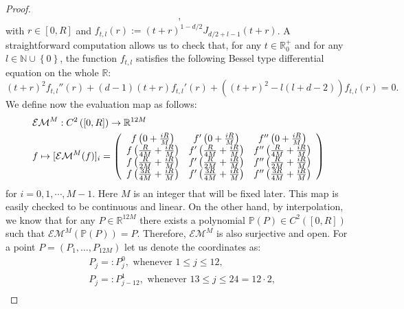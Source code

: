 \documentclass{amsart}
\theoremstyle{definition}
\theoremstyle{remark}
\renewcommand\leq\leqslant
\numberwithin{equation}{section}
\theoremstyle{definition}
\theoremstyle{remark}
\begin{document}
\begin{proof}
\begin{equation}
\begin{aligned}
            \,,
		\end{aligned}
	\end{equation}
	with $r\in [0,R]$ and $f_{t,l}(r):=\left(t+r\right)^{1-d/2}J_{d/2+l-1}\left(t+r\right)$. A straightforward computation allows us to check that, for any $t\in\mathbb{R}^+_0$ and for any $l\in\mathbb{N}\cup\left\{0\right\}$, the function $f_{t,l}$ satisfies the following Bessel type differential equation on the whole $\mathbb{R}$:
	\begin{equation}
		\left(t+r\right)^2 f_{t,l}''(r)+(d-1)(t+r)f_{t,l}'(r)+\left(\left(t+r\right)^2-l(l+d-2)\right)f_{t,l}(r)=0.
	\end{equation}
	We define now the evaluation map as follows:
	\begin{equation}
		\begin{aligned}
			& \mathcal{EM}^M: C^2\left(\left[0,R\right]\right)\rightarrow\mathbb{R}^{12M}\\&f\mapsto [\mathcal{EM}^M(f)]_i=\left(\begin{array}{c c c}
				f\left(0+\frac{iR}{M}\right) & f'\left(0+\frac{iR}{M}\right) & f''\left(0+\frac{iR}{M}\right) \\ f\left(\frac{R}{4M}+\frac{iR}{M}\right) &
				f'\left(\frac{R}{4M}+\frac{iR}{M}\right) & f''\left(\frac{R}{4M}+\frac{iR}{M}\right) \\ f\left(\frac{R}{2M}+\frac{iR}{M}\right) & f'\left(\frac{R}{2M}+\frac{iR}{M}\right) &
				f''\left(\frac{R}{2M}+\frac{iR}{M}\right)	\\ f\left(\frac{3R}{4M}+\frac{iR}{M}\right) & f'\left(\frac{3R}{4M}+\frac{iR}{M}\right) & f''\left(\frac{3R}{4M}+\frac{iR}{M}\right) \\
			\end{array}\right)
		\end{aligned}
	\end{equation}
    for $i=0,1,\cdots, M-1$.
	Here $M$ is an integer that will be fixed later. This map is easily checked to be continuous and linear.	On the other hand, by interpolation, we know that for any $P\in \mathbb{R}^{12M}$ there exists a polynomial $\mathbb{P}(P)\in C^2\left([0,R]\right) $ such that $\mathcal{EM}^M\left(\mathbb{P}(P)\right)=P$. Therefore, $\mathcal{EM}^M$ is also surjective and open. For a point $P=\left(P_1,\ldots,P_{12M}\right)$ let us denote the coordinates as: \begin{equation}
	    \begin{aligned}
	        &P_{j}=:P^0_j,\text{ whenever }1\leq j\leq 12,\\
            &P_{j}=:P^1_{j-12},\text{ whenever }13\leq j\leq 24=12\cdot 2,\\

\end{aligned}
\end{equation}
\end{proof}
\end{document}
